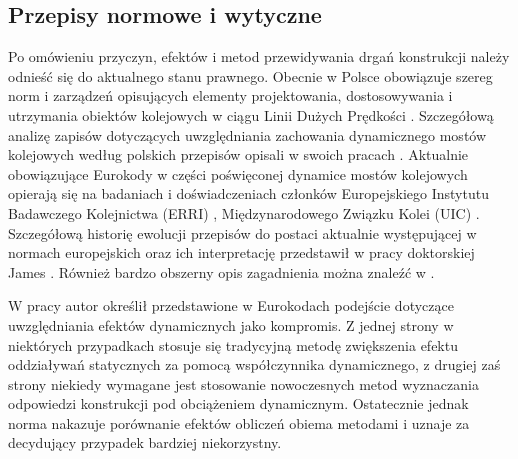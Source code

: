 \subsection{Przepisy normowe i wytyczne}
Po omówieniu przyczyn, efektów i metod przewidywania drgań konstrukcji należy odnieść się do aktualnego stanu prawnego. Obecnie w Polsce obowiązuje szereg norm i zarządzeń opisujących elementy projektowania, dostosowywania i utrzymania obiektów kolejowych w ciągu Linii Dużych Prędkości \parencite{PKNc,PKNj,PolskieLinieKolejoweS.A.2005,standardytechnicznetomIII,PolskiKomitetNormalizacyjny}. Szczegółową analizę zapisów dotyczących uwzględniania zachowania dynamicznego mostów kolejowych według polskich przepisów opisali w swoich pracach \cite{Oleszek2015,Oleszek2015b,Oleszek2016a}. Aktualnie obowiązujące Eurokody w części poświęconej dynamice mostów kolejowych opierają się na badaniach i doświadczeniach członków Europejskiego Instytutu Badawczego Kolejnictwa (ERRI) \parencite{ERRI1998,Muncke2008}, Międzynarodowego Związku Kolei (UIC) \parencite{UnionInternationaleDesCheminsDeFer2006,UnionInternationaleDesCheminsDeFer2009}. Szczegółową historię ewolucji przepisów do postaci aktualnie występującej w normach europejskich oraz ich interpretację przedstawił w pracy doktorskiej James \cite{James2003}. Również bardzo obszerny opis zagadnienia można znaleźć w \parencite{Dias2007,Goicolea2002}.

W pracy \cite{Karas2011a} autor określił przedstawione w Eurokodach podejście dotyczące uwzględniania efektów dynamicznych  jako kompromis. Z jednej strony w niektórych przypadkach stosuje się tradycyjną metodę zwiększenia efektu oddziaływań statycznych za pomocą współczynnika dynamicznego, z drugiej zaś strony niekiedy wymagane jest stosowanie nowoczesnych metod wyznaczania odpowiedzi konstrukcji pod obciążeniem dynamicznym. Ostatecznie jednak norma nakazuje porównanie efektów obliczeń obiema metodami i uznaje za decydujący przypadek bardziej niekorzystny. 

